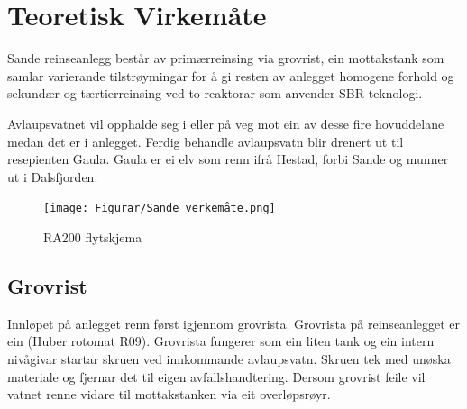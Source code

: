 \newpage
\section{Teoretisk Virkemåte}
\thispagestyle{fancy}

Sande reinseanlegg består av primærreinsing via grovrist, ein mottakstank 
som samlar varierande tilstrøymingar for å gi resten av anlegget homogene forhold og
sekundær og tærtierreinsing ved to reaktorar som anvender SBR-teknologi.

Avlaupsvatnet vil opphalde seg i eller på veg mot ein av desse fire hovuddelane medan det er i anlegget.
Ferdig behandle avlaupsvatn blir drenert ut til resepienten Gaula. 
Gaula er ei elv som renn ifrå Hestad, forbi Sande og munner ut i Dalsfjorden.

\begin{figure}[htbp]
    \centering
    \texttt{[image: Figurar/Sande verkemåte.png]}
    \caption{RA200 flytskjema}\label{fig:HMI}
\end{figure}

\subsection{Grovrist}
Innløpet på anlegget renn først igjennom grovrista. Grovrista på reinseanlegget
er ein (Huber rotomat R09). Grovrista fungerer som ein liten tank og ein intern nivågivar startar
skruen ved innkommande avlaupsvatn. Skruen tek med unøska materiale og fjernar det til eigen avfallshandtering.
Dersom grovrist feile vil vatnet renne vidare til mottakstanken via eit overløpsrøyr.

